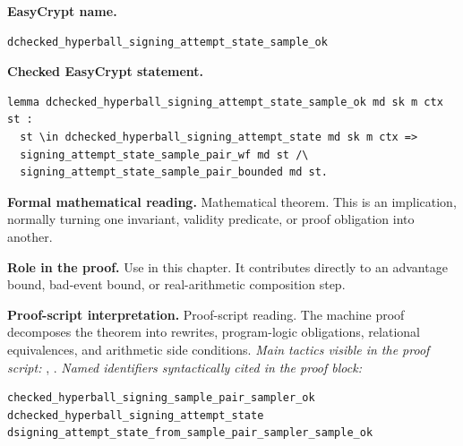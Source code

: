 \begin{formaltheorem}
\noindent\textbf{EasyCrypt name.}
\begin{lstlisting}[language=EasyCrypt,basicstyle=\ttfamily\scriptsize]
dchecked_hyperball_signing_attempt_state_sample_ok
\end{lstlisting}
\noindent\textbf{Checked EasyCrypt statement.}
\begin{lstlisting}[language=EasyCrypt,basicstyle=\ttfamily\scriptsize]
lemma dchecked_hyperball_signing_attempt_state_sample_ok md sk m ctx st :
  st \in dchecked_hyperball_signing_attempt_state md sk m ctx =>
  signing_attempt_state_sample_pair_wf md st /\
  signing_attempt_state_sample_pair_bounded md st.
\end{lstlisting}
\noindent\textbf{Formal mathematical reading.}
Mathematical theorem. This is an implication, normally turning one invariant, validity predicate, or proof obligation into another.

\noindent\textbf{Role in the proof.}
Use in this chapter. It contributes directly to an advantage bound, bad-event bound, or real-arithmetic composition step.

\noindent\textbf{Proof-script interpretation.}
Proof-script reading. The machine proof decomposes the theorem into rewrites, program-logic obligations, relational equivalences, and arithmetic side conditions.
\emph{Main tactics visible in the proof script:} \ec{rewrite}, \ec{apply}.
\emph{Named identifiers syntactically cited in the proof block:}
\begin{lstlisting}[language=EasyCrypt,basicstyle=\ttfamily\scriptsize]
checked_hyperball_signing_sample_pair_sampler_ok
dchecked_hyperball_signing_attempt_state
dsigning_attempt_state_from_sample_pair_sampler_sample_ok
\end{lstlisting}

\end{formaltheorem}

